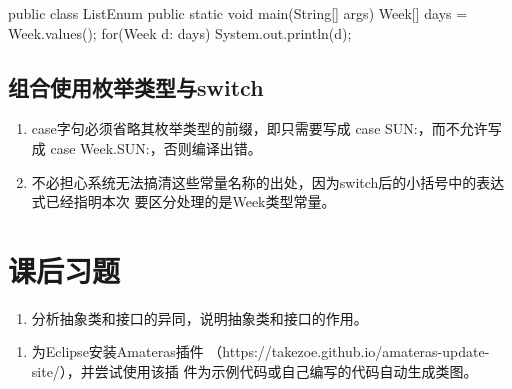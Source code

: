 \begin{javaCode}
  public class ListEnum {
    public static void main(String[] args) {
      Week[] days = Week.values();
      for(Week d: days) {
        System.out.println(d);
      }
    }
  }
\end{javaCode}

\subsection{组合使用枚举类型与switch}



\begin{enumerate}
\item case字句必须省略其枚举类型的前缀，即只需要写成 case SUN:，而不允许写成 case
  Week.SUN:，否则编译出错。
\item 不必担心系统无法搞清这些常量名称的出处，因为switch后的小括号中的表达式已经指明本次
  要区分处理的是Week类型常量。
\end{enumerate}


\section{课后习题}


\begin{enumerate}
\item 分析抽象类和接口的异同，说明抽象类和接口的作用。
\end{enumerate}


\begin{enumerate}
\item 为Eclipse安装Amateras插件
  （https://takezoe.github.io/amateras-update-site/），并尝试使用该插
  件为示例代码或自己编写的代码自动生成类图。
\end{enumerate}
